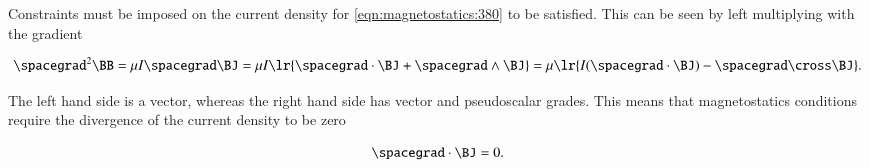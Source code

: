 Constraints must be imposed on the current density for \cref{eqn:magnetostatics:380} to be satisfied.
This can be seen by left multiplying with the gradient

\begin{dmath}\label{eqn:magnetostatics:440}
\spacegrad^2 \BB
= \mu I \spacegrad \BJ
= \mu I \lr{ \spacegrad \cdot \BJ + \spacegrad \wedge \BJ }
= \mu \lr{ I (\spacegrad \cdot \BJ) - \spacegrad \cross \BJ }.
\end{dmath}

The left hand side is a vector, whereas the right hand side has vector and pseudoscalar grades.
This means that magnetostatics conditions require the divergence of the current density to be zero

\begin{dmath}\label{eqn:magnetostatics:460}
\spacegrad \cdot \BJ = 0.
\end{dmath}
